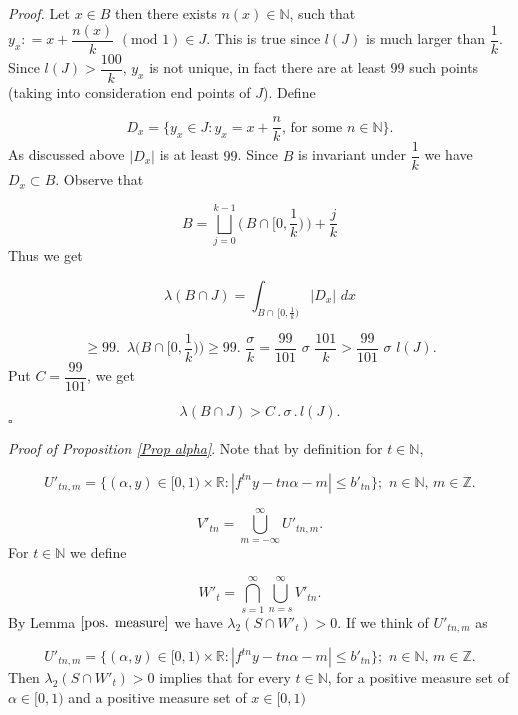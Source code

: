 \documentclass[11pt, english, reqno]{amsart}
\theoremstyle{definition}
\theoremstyle{remark}
\numberwithin{equation}{section}
\numberwithin{equation}{section}
\begin{document}
\noindent \textit{Proof.} Let $x \in B$ then there exists $n(x) \in \mathbb{N}$, such that $ y_x : = x + \dfrac{n(x)}{k} \,\, (\mathrm{mod} \,\,1) \in J$. This is true since $l(J)$ is much larger than $\dfrac{1}{k}$. Since $l(J) > \dfrac{100}{k}$, $y_x$ is not unique, in fact there are at least $99$ such points (taking into consideration end points of $J$). Define

$$
D_x = \{y_x \in J : y_x = x + \dfrac{n}{k},\, \textrm{for some} \,\, n \in \mathbb{N}\}.
$$ As discussed above $|D_x|$ is at least $99$. Since $B$ is invariant under $\dfrac{1}{k}$ we have $D_x \subset B$. Observe that

$$B = \underset{j=0}{\overset{k-1}{\bigsqcup}} \big(\, B \cap [0,\frac{1}{k})\,\big)+ \frac{j}{k}$$ Thus we get

$$
\lambda(B \cap J) = \int_{B \cap\, [0,\frac{1}{k})} |D_x| \,\, dx
$$

$$
\geq 99. \,\,\, \lambda \big(B \cap [0,\frac{1}{k})\big) \geq 99. \,\, \dfrac{\sigma}{k} =  \dfrac{99}{101} \,\,\sigma\,\, \dfrac{101}{k} >  \dfrac{99}{101} \,\,\sigma\,\, l(J).
$$ Put $C =  \dfrac{99}{101}$, we get

$$
\lambda(B \cap J) > C \,.\, \sigma \,.\, l(J). 
$$ \hfill{$\square$} 

\noindent\textit{Proof of Proposition \ref{Prop alpha}}. Note that by definition for $t\in \mathbb{N}$, 
 
 
\begin{equation}
    U'_{tn,m} = \{(\alpha,y) \in [0,1)\times \mathbb{R} : |f^{tn} y -tn\alpha - m| \leq b'_{tn}\} ;\,\, n\in \mathbb{N}, \, m \in \mathbb{Z}.
\end{equation}

\begin{equation}
    V'_{tn} = \underset{m=-\infty}{\overset{\infty}{\bigcup}} U'_{tn,m}. 
\end{equation} For $t\in \mathbb{N}$ we define

\begin{equation}\label{eq 3a}
    W'_t = \underset{s=1}{\overset{\infty}{\bigcap}} \underset{n=s}{\overset{\infty}{\bigcup}}V'_{tn}.
\end{equation} By Lemma $\ref{pos. measure}$ we have $\lambda_2 (S \cap W'_t) > 0$. If we think of $U'_{tn,m}$ as 


\begin{equation*}
    U'_{tn,m} = \{(\alpha,y) \in [0,1)\times \mathbb{R} : |f^{tn} y -tn\alpha - m| \leq b'_{tn}\} ;\,\, n\in \mathbb{N}, \, m \in \mathbb{Z}.
\end{equation*} Then $\lambda_2 (S \cap W'_t) > 0$ implies that for every $t\in \mathbb{N}$, for a positive measure set of $\alpha \in [0,1)$ and a positive measure set of $x \in [0,1)$
\end{document}

